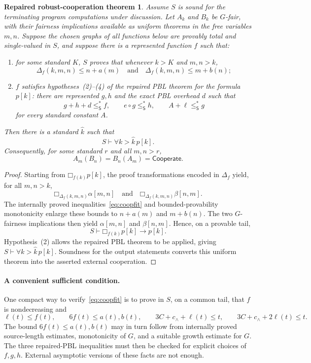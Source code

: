 \documentclass[11pt]{article}
\newtheorem*{repairedcooperation}{Repaired robust-cooperation theorem}
\theoremstyle{definition}
\theoremstyle{remark}
\newcommand{\Sth}{\mathsf{S}}
\newcommand{\elln}{\ell}
\newcommand{\Boxb}[1]{\mathord{\Box}_{#1}}
\newcommand{\leSstar}{\mathrel{\leq_{\Sth}^{*}}}
\newcommand{\Coop}{\mathsf{Cooperate}}
\begin{document}
\begin{repairedcooperation}
Assume $S$ is sound for the terminating program computations under discussion.  Let $A_k$ and $B_k$ be $G$-fair, with their fairness implications available as uniform theorems in the free variables $m,n$.  Suppose the chosen graphs of all functions below are provably total and single-valued in $S$, and suppose there is a represented function $f$ such that:
\begin{enumerate}[label=\textup{(\arabic*)},leftmargin=2.2em]
  \item for some standard $K$, $S$ proves that whenever $k>K$ and $m,n>k$,
  \begin{equation}\label{eq:coopfit}
  \Delta_f(k,m,n)\leq n+a(m)
  \quad\text{and}\quad
  \Delta_f(k,m,n)\leq m+b(n);
  \end{equation}
  \item $f$ satisfies hypotheses~\textup{(2)--(4)} of the repaired PBL theorem for the formula $p[k]$: there are represented $g,h$ and the exact PBL overhead $d$ such that
  \[
    g+h+d\leSstar f,
    \qquad
    e\circ g\leSstar h,
    \qquad
    A+\elln\leSstar g
  \]
  for every standard constant $A$.
\end{enumerate}
Then there is a standard $\widehat{k}$ such that
\[
  S\vdash\forall k>\widehat{k}\,p[k].
\]
Consequently, for some standard $r$ and all $m,n>r$,
\[
  A_m(B_n)=B_n(A_m)=\Coop.
\]
\end{repairedcooperation}

\begin{proof}
Starting from $\Boxb{f(k)}p[k]$, the proof transformations encoded in $\Delta_f$ yield, for all $m,n>k$,
\[
  \Boxb{\Delta_f(k,m,n)}\alpha[m,n]
  \quad\text{and}\quad
  \Boxb{\Delta_f(k,m,n)}\beta[n,m].
\]
The internally proved inequalities~\eqref{eq:coopfit} and bounded-provability monotonicity enlarge these bounds to $n+a(m)$ and $m+b(n)$.  The two $G$-fairness implications then yield $\alpha[m,n]$ and $\beta[n,m]$.  Hence, on a provable tail,
\[
  S\vdash \Boxb{f(k)}p[k]\to p[k].
\]
Hypothesis~(2) allows the repaired PBL theorem to be applied, giving $S\vdash\forall k>\widehat{k}\,p[k]$.  Soundness for the output statements converts this uniform theorem into the asserted external cooperation.
\end{proof}

\paragraph{A convenient sufficient condition.}
One compact way to verify~\eqref{eq:coopfit} is to prove in $S$, on a common tail, that $f$ is nondecreasing and
\[
  \elln(t)\leq f(t),
  \qquad
  6f(t)\leq a(t),b(t),
  \qquad
  3C+c_{\wedge}+\elln(t)\leq t,
  \qquad
  3C+c_{\wedge}+2\elln(t)\leq t.
\]
The bound $6f(t)\leq a(t),b(t)$ may in turn follow from internally proved source-length estimates, monotonicity of $G$, and a suitable growth estimate for $G$.  The three repaired-PBL inequalities must then be checked for explicit choices of $f,g,h$.  External asymptotic versions of these facts are not enough.
\end{document}
